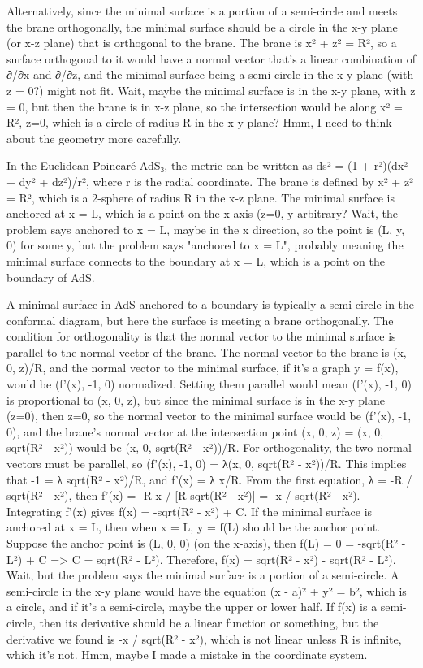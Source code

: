 Alternatively, since the minimal surface is a portion of a semi-circle and meets the brane orthogonally, the minimal surface should be a circle in the x-y plane (or x-z plane) that is orthogonal to the brane. The brane is x² + z² = R², so a surface orthogonal to it would have a normal vector that's a linear combination of ∂/∂x and ∂/∂z, and the minimal surface being a semi-circle in the x-y plane (with z = 0?) might not fit. Wait, maybe the minimal surface is in the x-y plane, with z = 0, but then the brane is in x-z plane, so the intersection would be along x² = R², z=0, which is a circle of radius R in the x-y plane? Hmm, I need to think about the geometry more carefully. 

In the Euclidean Poincaré AdS₃, the metric can be written as ds² = (1 + r²)(dx² + dy² + dz²)/r², where r is the radial coordinate. The brane is defined by x² + z² = R², which is a 2-sphere of radius R in the x-z plane. The minimal surface is anchored at x = L, which is a point on the x-axis (z=0, y arbitrary? Wait, the problem says anchored to x = L, maybe in the x direction, so the point is (L, y, 0) for some y, but the problem says "anchored to x = L", probably meaning the minimal surface connects to the boundary at x = L, which is a point on the boundary of AdS. 

A minimal surface in AdS anchored to a boundary is typically a semi-circle in the conformal diagram, but here the surface is meeting a brane orthogonally. The condition for orthogonality is that the normal vector to the minimal surface is parallel to the normal vector of the brane. The normal vector to the brane is (x, 0, z)/R, and the normal vector to the minimal surface, if it's a graph y = f(x), would be (f'(x), -1, 0) normalized. Setting them parallel would mean (f'(x), -1, 0) is proportional to (x, 0, z), but since the minimal surface is in the x-y plane (z=0), then z=0, so the normal vector to the minimal surface would be (f'(x), -1, 0), and the brane's normal vector at the intersection point (x, 0, z) = (x, 0, sqrt(R² - x²)) would be (x, 0, sqrt(R² - x²))/R. For orthogonality, the two normal vectors must be parallel, so (f'(x), -1, 0) = λ(x, 0, sqrt(R² - x²))/R. This implies that -1 = λ sqrt(R² - x²)/R, and f'(x) = λ x/R. From the first equation, λ = -R / sqrt(R² - x²), then f'(x) = -R x / [R sqrt(R² - x²)] = -x / sqrt(R² - x²). Integrating f'(x) gives f(x) = -sqrt(R² - x²) + C. If the minimal surface is anchored at x = L, then when x = L, y = f(L) should be the anchor point. Suppose the anchor point is (L, 0, 0) (on the x-axis), then f(L) = 0 = -sqrt(R² - L²) + C => C = sqrt(R² - L²). Therefore, f(x) = sqrt(R² - x²) - sqrt(R² - L²). Wait, but the problem says the minimal surface is a portion of a semi-circle. A semi-circle in the x-y plane would have the equation (x - a)² + y² = b², which is a circle, and if it's a semi-circle, maybe the upper or lower half. If f(x) is a semi-circle, then its derivative should be a linear function or something, but the derivative we found is -x / sqrt(R² - x²), which is not linear unless R is infinite, which it's not. Hmm, maybe I made a mistake in the coordinate system. 

